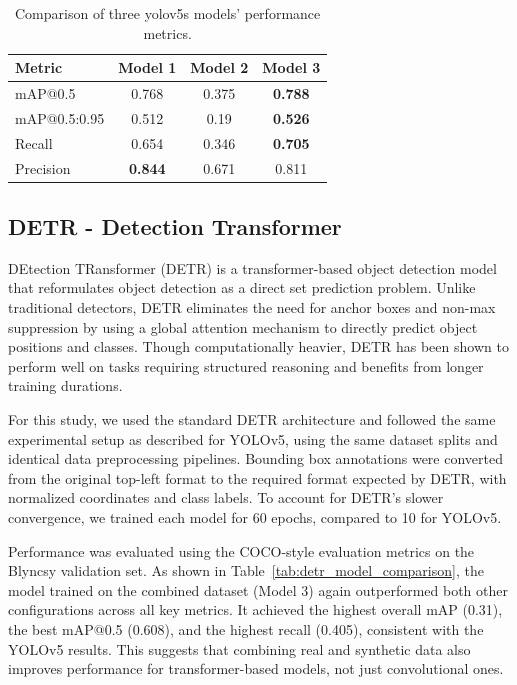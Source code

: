 \documentclass[journal]{IEEEtran}
\begin{document}
\begin{table}[ht]
\centering
\begin{tabular}{|l|c|c|c|}
\hline
\textbf{Metric} & \textbf{Model 1} & \textbf{Model 2} & \textbf{Model 3} \\
\hline
mAP@0.5 & 0.768 & 0.375 &  \textbf{0.788}\\
mAP@0.5:0.95 & 0.512 & 0.19 & \textbf{0.526}\\
Recall & 0.654 & 0.346 & \textbf{0.705}\\
Precision & \textbf{0.844} & 0.671& 0.811 \\
\hline
\end{tabular}
\caption{Comparison of three yolov5s models' performance metrics.}
\label{tab:model_comparison}
\end{table}

\subsection{DETR - Detection Transformer}
DEtection TRansformer (DETR) is a transformer-based object detection model that reformulates object detection as a direct set prediction problem. Unlike traditional detectors, DETR eliminates the need for anchor boxes and non-max suppression by using a global attention mechanism to directly predict object positions and classes. Though computationally heavier, DETR has been shown to perform well on tasks requiring structured reasoning and benefits from longer training durations.

For this study, we used the standard DETR architecture and followed the same experimental setup as described for YOLOv5, using the same dataset splits and identical data preprocessing pipelines. Bounding box annotations were converted from the original top-left format to the required format expected by DETR, with normalized coordinates and class labels. To account for DETR’s slower convergence, we trained each model for 60 epochs, compared to 10 for YOLOv5.

Performance was evaluated using the COCO-style evaluation metrics on the Blyncsy validation set. As shown in Table~\ref{tab:detr_model_comparison}, the model trained on the combined dataset (Model 3) again outperformed both other configurations across all key metrics. It achieved the highest overall mAP (0.31), the best mAP@0.5 (0.608), and the highest recall (0.405), consistent with the YOLOv5 results. This suggests that combining real and synthetic data also improves performance for transformer-based models, not just convolutional ones.
\end{document}
